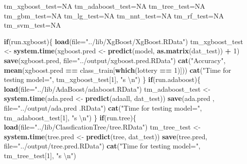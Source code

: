 \documentclass[]{article}
\newenvironment{Shaded}{\begin{snugshade}}{\end{snugshade}}
\newcommand{\KeywordTok}[1]{\textcolor[rgb]{0.13,0.29,0.53}{\textbf{#1}}}
\newcommand{\DataTypeTok}[1]{\textcolor[rgb]{0.13,0.29,0.53}{#1}}
\newcommand{\DecValTok}[1]{\textcolor[rgb]{0.00,0.00,0.81}{#1}}
\newcommand{\CharTok}[1]{\textcolor[rgb]{0.31,0.60,0.02}{#1}}
\newcommand{\StringTok}[1]{\textcolor[rgb]{0.31,0.60,0.02}{#1}}
\newcommand{\OtherTok}[1]{\textcolor[rgb]{0.56,0.35,0.01}{#1}}
\newcommand{\ControlFlowTok}[1]{\textcolor[rgb]{0.13,0.29,0.53}{\textbf{#1}}}
\newcommand{\OperatorTok}[1]{\textcolor[rgb]{0.81,0.36,0.00}{\textbf{#1}}}
\newcommand{\NormalTok}[1]{#1}
\begin{document}
\begin{Shaded}
\begin{Highlighting}[]
\NormalTok{tm_xgboost_test=}\OtherTok{NA}
\NormalTok{tm_adaboost_test=}\OtherTok{NA}
\NormalTok{tm_tree_test=}\OtherTok{NA}
\NormalTok{tm_gbm_test=}\OtherTok{NA}
\NormalTok{tm_lg_test=}\OtherTok{NA}
\NormalTok{tm_nnt_test=}\OtherTok{NA}
\NormalTok{tm_rf_test=}\OtherTok{NA}
\NormalTok{tm_svm_test=}\OtherTok{NA}

\ControlFlowTok{if}\NormalTok{(run.xgboost)\{}
  \KeywordTok{load}\NormalTok{(}\DataTypeTok{file=}\StringTok{"../lib/XgBoost/XgBoost.RData"}\NormalTok{)}
\NormalTok{  tm_xgboost_test <-}\StringTok{ }\KeywordTok{system.time}\NormalTok{(xgboost.pred <-}\StringTok{ }\KeywordTok{predict}\NormalTok{(model, }\KeywordTok{as.matrix}\NormalTok{(dat_test)) }\OperatorTok{+}\StringTok{ }\DecValTok{1}\NormalTok{)}
  \KeywordTok{save}\NormalTok{(xgboost.pred, }\DataTypeTok{file=}\StringTok{"../output/xgboost.pred.RData"}\NormalTok{)}
  \KeywordTok{cat}\NormalTok{(}\StringTok{"Accuracy"}\NormalTok{, }\KeywordTok{mean}\NormalTok{(xgboost.pred }\OperatorTok{==}\StringTok{ }\NormalTok{class_train[}\KeywordTok{which}\NormalTok{(lottery }\OperatorTok{==}\StringTok{ }\DecValTok{1}\NormalTok{)]))}
  \KeywordTok{cat}\NormalTok{(}\StringTok{"Time for testing model="}\NormalTok{, tm_xgboost_test[}\DecValTok{1}\NormalTok{], }\StringTok{"s }\CharTok{\textbackslash{}n}\StringTok{"}\NormalTok{)}
\NormalTok{\}}
\ControlFlowTok{if}\NormalTok{(run.adaboost)\{}
  \KeywordTok{load}\NormalTok{(}\DataTypeTok{file=}\StringTok{"../lib/AdaBoost/adaboost.RData"}\NormalTok{)}
\NormalTok{  tm_adaboost_test <-}\StringTok{ }\KeywordTok{system.time}\NormalTok{(ada.pred <-}\StringTok{ }\KeywordTok{predict}\NormalTok{(adaall, dat_test))}
  \KeywordTok{save}\NormalTok{(ada.pred , }\DataTypeTok{file=}\StringTok{"../output/ada.pred .RData"}\NormalTok{)}
  \KeywordTok{cat}\NormalTok{(}\StringTok{"Time for testing model="}\NormalTok{, tm_adaboost_test[}\DecValTok{1}\NormalTok{], }\StringTok{"s }\CharTok{\textbackslash{}n}\StringTok{"}\NormalTok{)}
\NormalTok{\}}
\ControlFlowTok{if}\NormalTok{(run.tree)\{}
  \KeywordTok{load}\NormalTok{(}\DataTypeTok{file=}\StringTok{"../lib/ClassficationTree/tree.RData"}\NormalTok{)}
\NormalTok{  tm_tree_test <-}\StringTok{ }\KeywordTok{system.time}\NormalTok{(tree.pred <-}\StringTok{ }\KeywordTok{predict}\NormalTok{(tree, dat_test))}
  \KeywordTok{save}\NormalTok{(tree.pred, }\DataTypeTok{file=}\StringTok{"../output/tree.pred.RData"}\NormalTok{)}
  \KeywordTok{cat}\NormalTok{(}\StringTok{"Time for testing model="}\NormalTok{, tm_tree_test[}\DecValTok{1}\NormalTok{], }\StringTok{"s }\CharTok{\textbackslash{}n}\StringTok{"}\NormalTok{)}

\end{Highlighting}
\end{Shaded}
\end{document}

